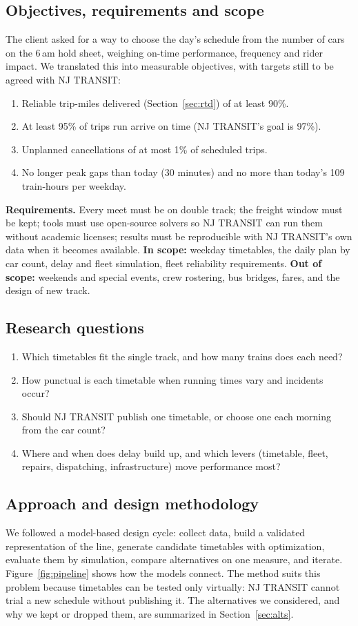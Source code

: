 \documentclass[11pt]{article}
\begin{document}
\subsection{Objectives, requirements and scope}\label{sec:objectives}
The client asked for a way to choose the day's schedule from the number of cars on the 6\,am hold sheet, weighing on-time performance, frequency and rider impact. We translated this into measurable objectives, with targets still to be agreed with NJ TRANSIT:
\begin{enumerate}[label=O\arabic*.]
\item Reliable trip-miles delivered (Section~\ref{sec:rtd}) of at least 90\%.
\item At least 95\% of trips run arrive on time (NJ TRANSIT's goal is 97\%).
\item Unplanned cancellations of at most 1\% of scheduled trips.
\item No longer peak gaps than today (30 minutes) and no more than today's 109 train-hours per weekday.
\end{enumerate}
\textbf{Requirements.} Every meet must be on double track; the freight window must be kept; tools must use open-source solvers so NJ TRANSIT can run them without academic licenses; results must be reproducible with NJ TRANSIT's own data when it becomes available.
\textbf{In scope:} weekday timetables, the daily plan by car count, delay and fleet simulation, fleet reliability requirements. \textbf{Out of scope:} weekends and special events, crew rostering, bus bridges, fares, and the design of new track.

\subsection{Research questions}
\begin{enumerate}[label=Q\arabic*.]
\item Which timetables fit the single track, and how many trains does each need?
\item How punctual is each timetable when running times vary and incidents occur?
\item Should NJ TRANSIT publish one timetable, or choose one each morning from the car count?
\item Where and when does delay build up, and which levers (timetable, fleet, repairs, dispatching, infrastructure) move performance most?
\end{enumerate}

\subsection{Approach and design methodology}\label{sec:method}
We followed a model-based design cycle: collect data, build a validated representation of the line, generate candidate timetables with optimization, evaluate them by simulation, compare alternatives on one measure, and iterate. Figure~\ref{fig:pipeline} shows how the models connect. The method suits this problem because timetables can be tested only virtually: NJ TRANSIT cannot trial a new schedule without publishing it. The alternatives we considered, and why we kept or dropped them, are summarized in Section~\ref{sec:alts}.
\end{document}
